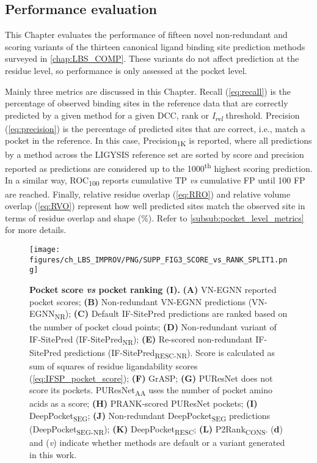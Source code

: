 \subsection{Performance evaluation}

This Chapter evaluates the performance of fifteen novel non-redundant and scoring variants of the thirteen canonical ligand binding site prediction methods surveyed in \autoref{chap:LBS_COMP}. These variants do not affect prediction at the residue level, so performance is only assessed at the pocket level.

Mainly three metrics are discussed in this Chapter. Recall (\autoref{eq:recall}) is the percentage of observed binding sites in the reference data that are correctly predicted by a given method for a given DCC, rank or \textit{I\textsubscript{rel}} threshold. Precision (\autoref{eq:precision}) is the percentage of predicted sites that are correct, i.e., match a pocket in the reference. In this case, Precision\textsubscript{1K} is reported, where all predictions by a method across the LIGYSIS reference set are sorted by score and precision reported as predictions are considered up to the 1000\textsuperscript{th} highest scoring prediction. In a similar way, ROC\textsubscript{100} \cite{WEBBER_2003_ROC100} reports cumulative TP \textit{vs} cumulative FP until 100 FP are reached. Finally, relative residue overlap (\autoref{eq:RRO}) and relative volume overlap (\autoref{eq:RVO}) represent how well predicted sites match the observed site in terms of residue overlap and shape (\%). Refer to \autoref{subsub:pocket_level_metrics} for more details.

\FloatBarrier

\begin{figure}[htb!]
    \centering
    \texttt{[image: figures/ch\_LBS\_IMPROV/PNG/SUPP\_FIG3\_SCORE\_vs\_RANK\_SPLIT1.png]}
    \caption[Pocket score \textit{vs} pocket ranking (I)]{\textbf{Pocket score \textit{vs} pocket ranking (I).} \textbf{(A)} VN-EGNN reported pocket scores; \textbf{(B)} Non-redundant VN-EGNN predictions (VN-EGNN\textsubscript{NR}); \textbf{(C)} Default IF-SitePred predictions are ranked based on the number of pocket cloud points; \textbf{(D)} Non-redundant variant of IF-SitePred (IF-SitePred\textsubscript{NR}); \textbf{(E)} Re-scored non-redundant IF-SitePred predictions (IF-SitePred\textsubscript{RESC-NR}). Score is calculated as sum of squares of residue ligandability scores (\autoref{eq:IFSP_pocket_score}); \textbf{(F)} GrASP; \textbf{(G)} PUResNet does not score its pockets. PUResNet\textsubscript{AA} uses the number of pocket amino acids as a score; \textbf{(H)} PRANK-scored PUResNet pockets; \textbf{(I)} DeepPocket\textsubscript{SEG}; \textbf{(J)} Non-redundant DeepPocket\textsubscript{SEG} predictions (DeepPocket\textsubscript{SEG-NR}); \textbf{(K)} DeepPocket\textsubscript{RESC}; \textbf{(L)} P2Rank\textsubscript{CONS}. (\textbf{d}) and (\textit{v}) indicate whether methods are default or a variant generated in this work.}
    \label{fig:pocket_score_vs_rank1}
\end{figure}

